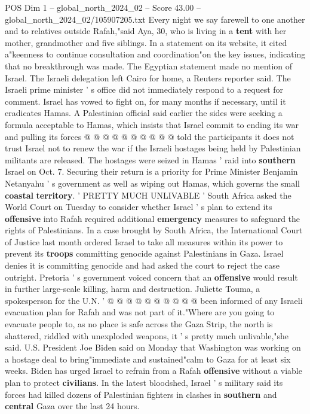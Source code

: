 \begin{textsample}{POS Dim 1 – global\_north\_2024\_02 – Score 43.00 – global\_north\_2024\_02/105907205.txt}
Every night we say farewell to one another and to relatives outside Rafah,"said Aya, 30, who is living in a \textbf{tent} with her mother, grandmother and five siblings.
In a statement on its website, it cited a"keenness to continue consultation and coordination"on the key issues, indicating that no breakthrough was made.
The Egyptian statement made no mention of Israel.
The Israeli delegation left Cairo for home, a Reuters reporter said.
The Israeli prime minister ' s office did not immediately respond to a request for comment.
Israel has vowed to fight on, for many months if necessary, until it eradicates Hamas.
A Palestinian official said earlier the sides were seeking a formula acceptable to Hamas, which insists that Israel commit to ending its war and pulling its forces @ @ @ @ @ @ @ @ @ @ told the participants it does not trust Israel not to renew the war if the Israeli hostages being held by Palestinian militants are released.
The hostages were seized in Hamas ' raid into \textbf{southern} Israel on Oct. 7.
Securing their return is a priority for Prime Minister Benjamin Netanyahu ' s government as well as wiping out Hamas, which governs the small \textbf{coastal} \textbf{territory}. ' PRETTY MUCH UNLIVABLE ' South Africa asked the World Court on Tuesday to consider whether Israel ' s plan to extend its \textbf{offensive} into Rafah required additional \textbf{emergency} measures to safeguard the rights of Palestinians.
In a case brought by South Africa, the International Court of Justice last month ordered Israel to take all measures within its power to prevent its \textbf{troops} committing genocide against Palestinians in Gaza.
Israel denies it is committing genocide and had asked the court to reject the case outright.
Pretoria ' s government voiced concern that an \textbf{offensive} would result in further large-scale killing, harm and destruction.
Juliette Touma, a spokesperson for the U.N. ' @ @ @ @ @ @ @ @ @ @ been informed of any Israeli evacuation plan for Rafah and was not part of it."Where are you going to evacuate people to, as no place is safe across the Gaza Strip, the north is shattered, riddled with unexploded weapons, it ' s pretty much unlivable,"she said.
U.S.
President Joe Biden said on Monday that Washington was working on a hostage deal to bring"immediate and sustained"calm to Gaza for at least six weeks.
Biden has urged Israel to refrain from a Rafah \textbf{offensive} without a viable plan to protect \textbf{civilians}.
In the latest bloodshed, Israel ' s military said its forces had killed dozens of Palestinian fighters in clashes in \textbf{southern} and \textbf{central} Gaza over the last 24 hours.

\end{textsample}
